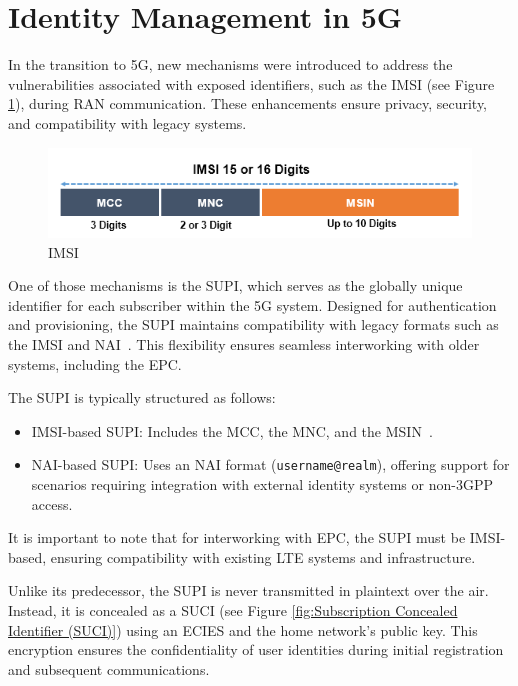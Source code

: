 \section{Identity Management in \acs{5G}}

In the transition to \ac{5G}, new mechanisms were introduced to address the vulnerabilities associated with exposed identifiers, such as the \ac{IMSI} (see Figure \ref{fig:International Mobile Subscriber Identity (IMSI)}), during \ac{RAN} communication. These enhancements ensure privacy, security, and compatibility with legacy systems.

\begin{figure}
    \centering
    \includegraphics[width=0.75\linewidth]{figs/International Mobile Subscriber Identity (IMSI).png}
    \caption{\acs{IMSI}}
    \label{fig:International Mobile Subscriber Identity (IMSI)}
\end{figure}

One of those mechanisms is the \ac{SUPI}, which serves as the globally unique identifier for each subscriber within the \ac{5G} system. Designed for authentication and provisioning, the \ac{SUPI} maintains compatibility with legacy formats such as the \ac{IMSI} and \ac{NAI}~\cite{23.501-p243}. This flexibility ensures seamless interworking with older systems, including the \ac{EPC}.

The \ac{SUPI} is typically structured as follows:
\begin{itemize}
    \item {
        \ac{IMSI}-based \ac{SUPI}: Includes the \ac{MCC}, the \ac{MNC}, and the \ac{MSIN}~\cite{23.003-p20}.
    }
    \item {
        \ac{NAI}-based \ac{SUPI}: Uses an \ac{NAI} format (\texttt{username@realm}), offering support for scenarios requiring integration with external identity systems or non-\ac{3GPP} access.
    }
\end{itemize}

It is important to note that for interworking with \ac{EPC}, the \ac{SUPI} must be \ac{IMSI}-based, ensuring compatibility with existing \ac{LTE} systems and infrastructure.

Unlike its predecessor, the \ac{SUPI} is never transmitted in plaintext over the air. Instead, it is concealed as a \ac{SUCI} (see Figure \ref{fig:Subscription Concealed Identifier (SUCI)}) using an \ac{ECIES} and the home network’s public key. This encryption ensures the confidentiality of user identities during initial registration and subsequent communications.

